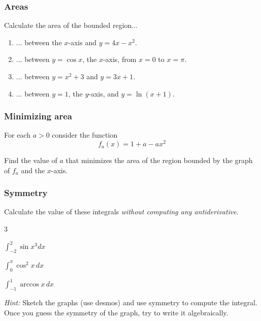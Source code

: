 \documentclass[14pt]{beamer}
\begin{document}
\begin{frame}[t]
	\frametitle{Areas}

	Calculate the area of the bounded region...
	\vspace{.2cm}
	\begin{enumerate}
		\item ... between the $x$-axis and $\displaystyle y=4x-x^{2}$.
			\vspace{.2cm}

		\item ... between $y=\cos x$, the $x$-axis, from $x=0$ to $x=\pi$.
			\vspace{.2cm}

		\item ... between $\displaystyle y=x^{2}+3$ and $\displaystyle y=3x+1$.
			\vspace{.2cm}

		\item ... between $y=1$, the $y$-axis, and $y=\ln(x+1)$.
	\end{enumerate}
\end{frame}

\begin{frame}[t]
	\frametitle{Minimizing area}

	For each $a >0$ consider the function
	\[
		f_{a}(x) = 1 + a -ax^{2}
	\]

	Find the value of $a$ that minimizes the area of the region bounded by the graph
	of $f_{a}$ and the $x$-axis. \hfill
	\href{https://www.desmos.com/calculator/x7vkfcerdp}{}
\end{frame}

\begin{frame}[t]
	\frametitle{Symmetry}

	Calculate the value of these integrals \emph{without computing any
	antiderivative}.

	\begin{enumerate}
	\end{enumerate}

	\emph{Hint:} Sketch the graphs (use desmos) and use symmetry to compute the integral.
	\\ Once you guess the symmetry of the graph, try to write it algebraically.
	\hfill
	\href{https://www.desmos.com/calculator/ncysdsu3yv}{}
	\href{https://www.desmos.com/calculator/fwjs5zoury}{}
	\href{https://www.desmos.com/calculator/tjakgza6vf}{}
\end{frame}
\end{document}
